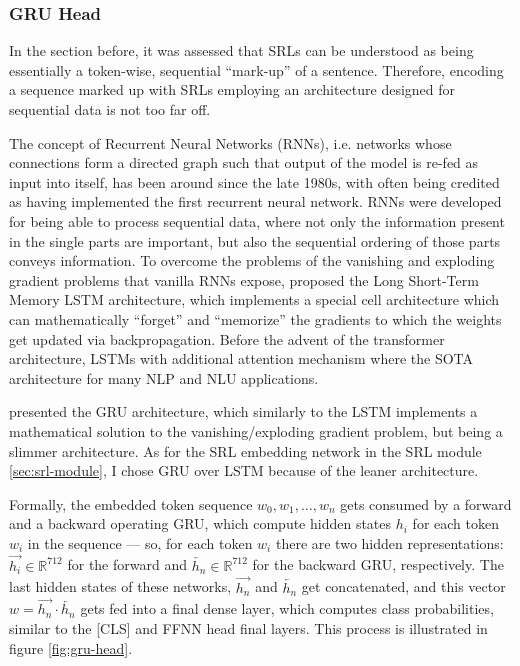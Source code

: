 \subsubsection{GRU Head}

In the section before, it was assessed that SRLs can be understood as being essentially a
token-wise, sequential ``mark-up'' of a sentence. Therefore, encoding a sequence marked up
with SRLs employing an architecture designed for sequential data is not too far off.


The concept of Recurrent Neural Networks (RNNs), i.e. networks whose connections form a directed
graph such that output of the model is re-fed as input into itself, has been around since the
late 1980s, with \citep{hopfield1982neural} often being credited as having implemented the first
recurrent neural network. RNNs were developed for being able to process sequential data, where
not only the information present in the single parts are important, but also the sequential
ordering of those parts conveys information. To overcome the problems of the vanishing and exploding gradient
problems that vanilla RNNs expose, \citep{hochreiter1997long} proposed the Long Short-Term
Memory LSTM architecture, which implements a special cell architecture which can mathematically
``forget'' and ``memorize'' the gradients to which the weights get updated via backpropagation.
Before the advent of the transformer architecture, LSTMs with additional attention mechanism
where the SOTA architecture for many NLP and NLU applications.

\cite{cho2014learning} presented the GRU architecture, which similarly to the LSTM
implements a mathematical solution to the vanishing/exploding gradient problem, but
being a slimmer architecture. As for the SRL embedding network in the SRL module
\ref{sec:srl-module}, I chose GRU over LSTM because of the leaner architecture.

Formally, the embedded token sequence $w_0, w_1, \dotso , w_n$ gets consumed by a
forward and a backward operating GRU, which compute hidden states $h_i$ for each token
$w_i$ in the sequence --- so, for each token $w_i$ there are two hidden representations:
$\overrightarrow{h_i} \in \mathbb{R}^{712}$ for the forward and $\overleftarrow{h_n} \in
\mathbb{R}^{712}$ for the backward GRU, respectively. The last hidden states of these
networks, $\overrightarrow{h_n}$ and $\overleftarrow{h_n}$ get concatenated, and this
vector $w = \overrightarrow{h_n} \cdot \overleftarrow{h_n}$ gets fed into a final dense
layer, which computes class probabilities, similar to the [CLS] and FFNN head final
layers. This
process is illustrated in figure \ref{fig:gru-head}.


